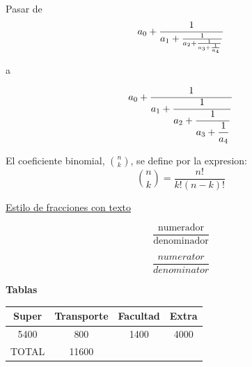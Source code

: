 \documentclass[]{article} %
\begin{document}

        Pasar de
        \[
             a_0+{1\over a_1+
                  {1\over a_2+
                    {1 \over a_3 + 
                       {1 \over a_4}}}}
        \]

        a

        \[
            a_0+{1\over\displaystyle a_1+
                {1\over\displaystyle a_2+
                    {1 \over\displaystyle a_3 + 
                    {1 \over\displaystyle a_4}}}}
            \]
        


        El coeficiente binomial, \(\binom{n}{k}\), se define por la expresion:
        \[
            \binom{n}{k} = \frac{n!}{k!(n-k)!}
        \]


        \underline{Estilo de fracciones con texto}

        \[\frac{\text{numerador}}{\text{denominador}}\]


        \[\frac{numerator}{denominator}\]

        \pagebreak
        \textbf{Tablas}\\

        \begin{tabular}{|c|c|c|c|}
            \hline
            Super & Transporte & Facultad & Extra \\
            \hline
            5400 & 800 & 1400 & 4000 \\
            \hline
            TOTAL & 11600 \\
            
        \end{tabular}
  
\end{document}
